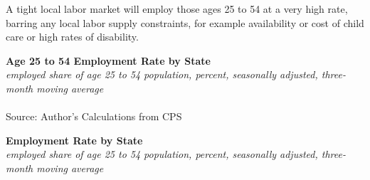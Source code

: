 \documentclass{report}
\begin{document}
{\begin{minipage}{1.0\textwidth}
\small A tight local labor market will employ those ages 25 to 54 at a very high rate, barring any local labor supply constraints, for example availability or cost of child care or high rates of disability. 


\end{minipage}

\normalsize \textbf{Age 25 to 54 Employment Rate by State}\\
\footnotesize{\textit{employed share of age 25 to 54 population, percent, seasonally adjusted, three-month moving average}}\\
\vspace{-3mm}
\hspace{-9mm}  \\
\footnotesize{Source: Author's Calculations from CPS}
\vspace{3mm}

\normalsize \textbf{Employment Rate by State}\\
\footnotesize{\textit{employed share of age 25 to 54 population, percent, seasonally adjusted, three-month moving average}}
\vspace{-2mm}

}
\end{document}
